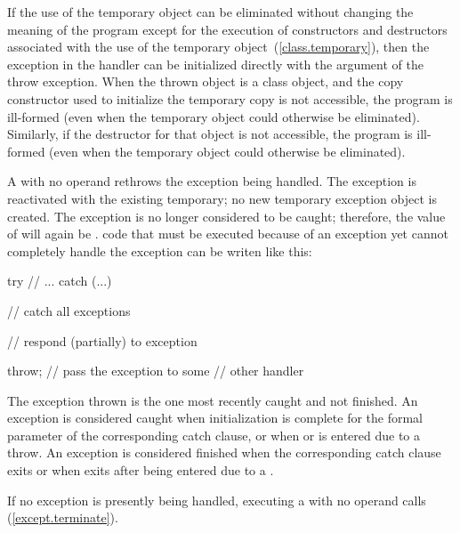 \pnum
{}%
%
If the use of the temporary object can be eliminated without changing the
meaning of the program except for the execution of constructors and
destructors associated with the use of the temporary
object~(\ref{class.temporary}), then the exception in the handler can be
initialized directly with the argument of the throw exception.
When the thrown object is a class object, and the copy constructor used to
initialize the temporary copy is not accessible, the program is ill-formed
(even when the temporary object could otherwise be eliminated).
Similarly, if the destructor for that object is not accessible, the
program is ill-formed (even when the temporary object could otherwise
be eliminated).

\pnum
{}%
%
%
A  with no operand rethrows the exception
being handled. The exception is reactivated with the existing temporary;
no new temporary exception object is created. The exception is no longer
considered to be caught; therefore, the value of 
will again be .
\enterexample
code that must be executed because of an exception yet cannot completely
handle the exception can be writen like this:
\begin{codeblock}
try {
	// ...
}
catch (...) {			// catch all exceptions

	// respond (partially) to exception

	throw;			// pass the exception to some
				// other handler
}
\end{codeblock}
\exitexampleb

\pnum
{}%
%
The exception thrown is the one most recently caught and not finished. An
exception is considered caught when initialization is complete for the
formal parameter of the corresponding catch clause, or when 
or  is entered due to a throw. An exception is considered
finished when the corresponding catch clause exits or when 
exits after being entered due to a .

\pnum
{}%
%
%
If no exception is presently being handled,
executing a
with no operand calls
 (\ref{except.terminate}).

